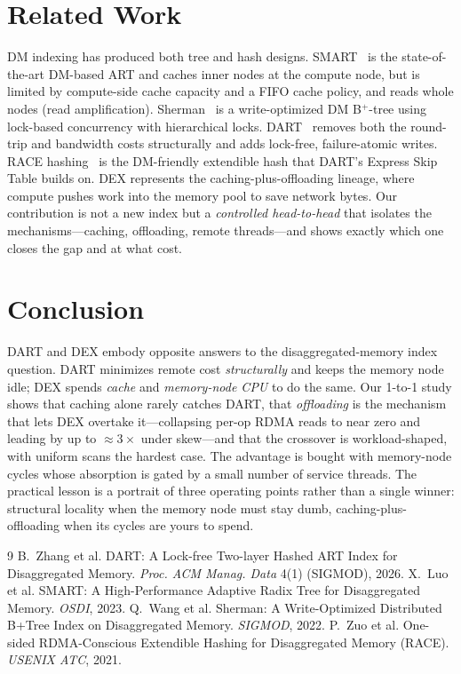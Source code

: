 \documentclass[sigconf,nonacm]{acmart}
\begin{document}
\section{Related Work}
\label{sec:rel}
DM indexing has produced both tree and hash designs. SMART~\cite{smart} is the
state-of-the-art DM-based ART and caches inner nodes at the compute node, but is
limited by compute-side cache capacity and a FIFO cache policy, and reads whole
nodes (read amplification). Sherman~\cite{sherman} is a write-optimized DM
B$^+$-tree using lock-based concurrency with hierarchical locks. DART~\cite{dart}
removes both the round-trip and bandwidth costs structurally and adds lock-free,
failure-atomic writes. RACE hashing~\cite{race} is the DM-friendly extendible
hash that DART's Express Skip Table builds on. DEX represents the
caching-plus-offloading lineage, where compute pushes work into the memory pool
to save network bytes. Our contribution is not a new index but a \emph{controlled
head-to-head} that isolates the mechanisms---caching, offloading, remote
threads---and shows exactly which one closes the gap and at what cost.

\section{Conclusion}
\label{sec:conc}
DART and DEX embody opposite answers to the disaggregated-memory index question.
DART minimizes remote cost \emph{structurally} and keeps the memory node idle;
DEX spends \emph{cache} and \emph{memory-node CPU} to do the same. Our 1-to-1
study shows that caching alone rarely catches DART, that \emph{offloading} is the
mechanism that lets DEX overtake it---collapsing per-op RDMA reads to near zero
and leading by up to $\approx3\times$ under skew---and that the crossover is
workload-shaped, with uniform scans the hardest case. The advantage is bought
with memory-node cycles whose absorption is gated by a small number of service
threads. The practical lesson is a portrait of three operating points rather than
a single winner: structural locality when the memory node must stay dumb,
caching-plus-offloading when its cycles are yours to spend.

\balance
\begin{thebibliography}{9}
 B.~Zhang et al. DART: A Lock-free Two-layer Hashed ART Index for
  Disaggregated Memory. \emph{Proc. ACM Manag. Data} 4(1) (SIGMOD), 2026.
 X.~Luo et al. SMART: A High-Performance Adaptive Radix Tree for
  Disaggregated Memory. \emph{OSDI}, 2023.
 Q.~Wang et al. Sherman: A Write-Optimized Distributed B+Tree
  Index on Disaggregated Memory. \emph{SIGMOD}, 2022.
 P.~Zuo et al. One-sided RDMA-Conscious Extendible Hashing for
  Disaggregated Memory (RACE). \emph{USENIX ATC}, 2021.
\end{thebibliography}
\end{document}
